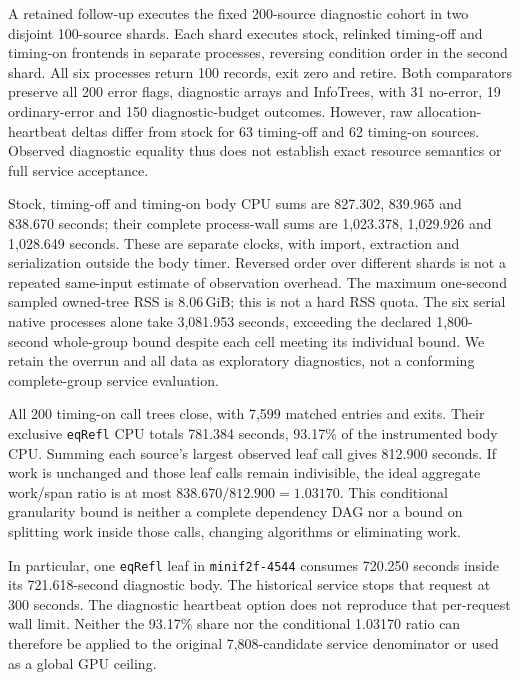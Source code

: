 \documentclass[10pt,twocolumn]{article}
\begin{document}
A retained follow-up executes the fixed 200-source diagnostic cohort in two
disjoint 100-source shards. Each shard executes stock, relinked timing-off
and timing-on frontends in separate processes, reversing condition order in
the second shard. All six processes return 100 records, exit zero and retire.
Both comparators preserve all 200 error flags, diagnostic arrays and
InfoTrees, with 31 no-error, 19 ordinary-error and 150 diagnostic-budget
outcomes. However, raw allocation-heartbeat deltas differ from stock for
63 timing-off and 62 timing-on sources. Observed diagnostic equality thus
does not establish exact resource semantics or full service acceptance.

Stock, timing-off and timing-on body CPU sums are 827.302, 839.965 and
838.670 seconds; their complete process-wall sums are 1,023.378, 1,029.926
and 1,028.649 seconds. These are separate clocks, with import, extraction
and serialization outside the body timer. Reversed order over different
shards is not a repeated same-input estimate of observation overhead.
The maximum one-second sampled owned-tree RSS is 8.06\,GiB; this is not a
hard RSS quota.
The six serial native processes alone take 3,081.953 seconds, exceeding
the declared 1,800-second whole-group bound despite each cell meeting its
individual bound. We retain the overrun and all data as exploratory
diagnostics, not a conforming complete-group service evaluation.

All 200 timing-on call trees close, with 7,599 matched entries and exits.
Their exclusive \texttt{eqRefl} CPU totals 781.384 seconds, 93.17\% of
the instrumented body CPU. Summing each source's largest observed leaf call
gives 812.900 seconds. If work is unchanged and those leaf calls remain
indivisible, the ideal aggregate work/span ratio is at most
$838.670/812.900=1.03170$. This conditional granularity bound is neither a
complete dependency DAG nor a bound on splitting work inside those calls,
changing algorithms or eliminating work.

In particular, one \texttt{eqRefl} leaf in \texttt{minif2f-4544} consumes
720.250 seconds inside its 721.618-second diagnostic body. The historical
service stops that request at 300 seconds. The diagnostic heartbeat option
does not reproduce that per-request wall limit. Neither the 93.17\% share
nor the conditional 1.03170 ratio can therefore be applied to the original
7,808-candidate service denominator or used as a global GPU ceiling.
\end{document}
